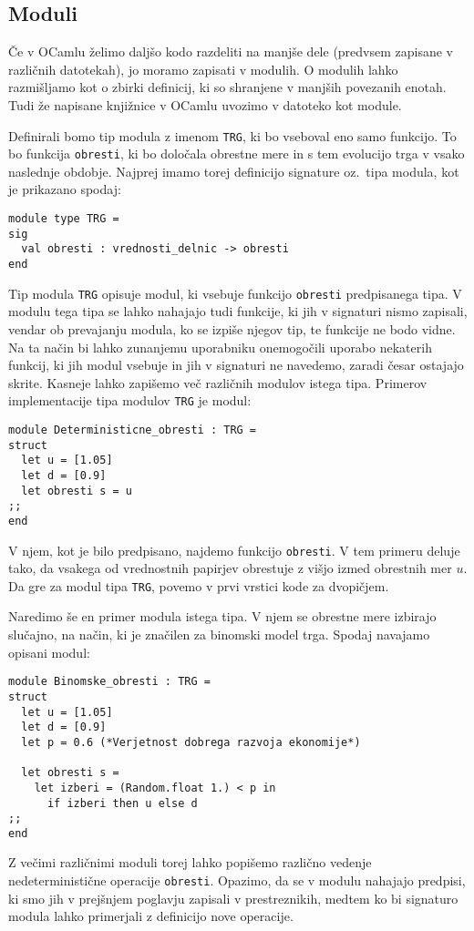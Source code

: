 \documentclass[a4paper,12pt]{article}
\theoremstyle{definition} %
\begin{document}
\subsection{Moduli}

Če v OCamlu želimo daljšo kodo razdeliti na manjše dele (predvsem zapisane v različnih datotekah), jo moramo zapisati v modulih. O modulih lahko razmišljamo kot o zbirki definicij, ki so shranjene v manjših povezanih enotah. Tudi že napisane knjižnice v OCamlu uvozimo v datoteko kot module.

Definirali bomo tip modula z imenom \lstinline{TRG}, ki bo vseboval eno samo funkcijo. To bo funkcija \lstinline{obresti}, ki bo določala obrestne mere in s tem evolucijo trga v vsako naslednje obdobje. Najprej imamo torej definicijo signature oz.\ tipa modula, kot je prikazano spodaj:
\begin{lstlisting}
module type TRG =
sig
  val obresti : vrednosti_delnic -> obresti
end
\end{lstlisting}
Tip modula \lstinline{TRG} opisuje modul, ki vsebuje funkcijo \lstinline{obresti} predpisanega tipa. V modulu tega tipa se lahko nahajajo tudi funkcije, ki jih v signaturi nismo zapisali, vendar ob prevajanju modula, ko se izpiše njegov tip, te funkcije ne bodo vidne. Na ta način bi lahko zunanjemu uporabniku onemogočili uporabo nekaterih funkcij, ki jih modul vsebuje in jih v signaturi ne navedemo, zaradi česar ostajajo skrite.
Kasneje lahko zapišemo več različnih modulov istega tipa. Primerov implementacije tipa modulov \lstinline{TRG} je modul:
\begin{lstlisting}
module Deterministicne_obresti : TRG =
struct
  let u = [1.05]
  let d = [0.9]
  let obresti s = u
;;
end
\end{lstlisting}
V njem, kot je bilo predpisano, najdemo funkcijo \lstinline{obresti}. V tem primeru deluje tako, da vsakega od vrednostnih papirjev obrestuje z višjo izmed obrestnih mer $u$. Da gre za modul tipa \lstinline{TRG}, povemo v prvi vrstici kode za dvopičjem.

Naredimo še en primer modula istega tipa. V njem se obrestne mere izbirajo slučajno, na način, ki je značilen za binomski model trga. Spodaj navajamo opisani modul:
\begin{lstlisting}
module Binomske_obresti : TRG =
struct
  let u = [1.05]
  let d = [0.9]
  let p = 0.6 (*Verjetnost dobrega razvoja ekonomije*)

  let obresti s =
    let izberi = (Random.float 1.) < p in
      if izberi then u else d
;;
end
\end{lstlisting}
Z večimi različnimi moduli torej lahko popišemo različno vedenje nedeterministične operacije \lstinline{obresti}. Opazimo, da se v modulu nahajajo predpisi, ki smo jih v prejšnjem poglavju zapisali v prestreznikih, medtem ko bi signaturo modula lahko primerjali z definicijo nove operacije.
\end{document}
